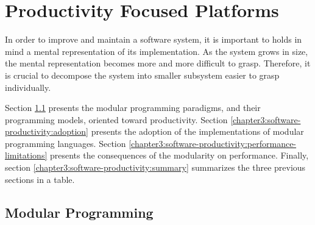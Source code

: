 \section{Productivity Focused Platforms} \label{chapter3:software-productivity}


In order to improve and maintain a software system, it is important to holds in mind a mental representation of its implementation.
As the system grows in size, the mental representation becomes more and more difficult to grasp.
Therefore, it is crucial to decompose the system into smaller subsystem easier to grasp individually.



Section \ref{chapter3:software-productivity:modularity} presents the modular programming paradigms, and their programming models, oriented toward productivity.
Section \ref{chapter3:software-productivity:adoption} presents the adoption of the implementations of modular programming languages.
Section \ref{chapter3:software-productivity:performance-limitations} presents the consequences of the modularity on performance.
Finally, section \ref{chapter3:software-productivity:summary} summarizes the three previous sections in a table.

\subsection{Modular Programming} \label{chapter3:software-productivity:modularity}

